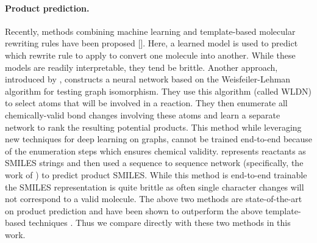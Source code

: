 \paragraph{Product prediction.}
Recently, methods combining machine learning and template-based molecular rewriting rules have been proposed [\cite{coley2017prediction,neural-symbolic,segler2018planning,wei2016neural,zhang2005structure}]. Here, a learned model is used to predict which rewrite rule to apply to convert one molecule into another. While these models are readily interpretable, they tend be brittle. 
Another approach, introduced by \cite{jin2017predicting}, constructs a neural network based on the Weisfeiler-Lehman algorithm for testing graph isomorphism. They use this algorithm (called WLDN) to select atoms that will be involved in a reaction. They then enumerate all chemically-valid bond changes involving these atoms and learn a separate network to rank the resulting potential products. This method while leveraging new techniques for deep learning on graphs, cannot be trained end-to-end because of the enumeration steps which ensures chemical validity.
\cite{schwaller2017found} represents reactants as SMILES \citep{weininger1988smiles} strings and then used a sequence to sequence network (specifically, the work of \citet{Zhao2017}) to predict product SMILES. While this method is end-to-end trainable the SMILES representation is quite brittle as often single character changes will not correspond to a valid molecule. The above two methods are state-of-the-art on product prediction and have been shown to outperform the above template-based techniques \citet{jin2017predicting}. Thus we compare directly with these two methods in this work.


